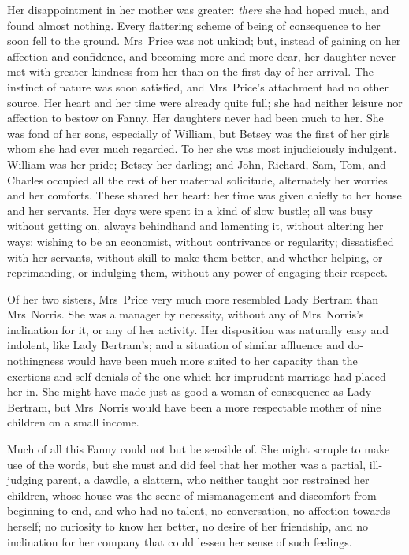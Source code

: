 Her disappointment in her mother was greater: \textit{there}  she had hoped much, and found almost nothing. Every flattering scheme of being of consequence to her soon fell to the ground. Mrs~Price was not unkind; but, instead of gaining on her affection and confidence, and becoming more and more dear, her daughter never met with greater kindness from her than on the first day of her arrival. The instinct of nature was soon satisfied, and Mrs~Price's attachment had no other source. Her heart and her time were already quite full; she had neither leisure nor affection to bestow on Fanny. Her daughters never had been much to her. She was fond of her sons, especially of William, but Betsey was the first of her girls whom she had ever much regarded. To her she was most injudiciously indulgent. William was her pride; Betsey her darling; and John, Richard, Sam, Tom, and Charles occupied all the rest of her maternal solicitude, alternately her worries and her comforts. These shared her heart: her time was given chiefly to her house and her servants. Her days were spent in a kind of slow bustle; all was busy without getting on, always behindhand and lamenting it, without altering her ways; wishing to be an economist, without contrivance or regularity; dissatisfied with her servants, without skill to make them better, and whether helping, or reprimanding, or indulging them, without any power of engaging their respect.

Of her two sisters, Mrs~Price very much more resembled Lady Bertram than Mrs~Norris. She was a manager by necessity, without any of Mrs~Norris's inclination for it, or any of her activity. Her disposition was naturally easy and indolent, like Lady Bertram's; and a situation of similar affluence and do-nothingness would have been much more suited to her capacity than the exertions and self-denials of the one which her imprudent marriage had placed her in. She might have made just as good a woman of consequence as Lady Bertram, but Mrs~Norris would have been a more respectable mother of nine children on a small income.

Much of all this Fanny could not but be sensible of. She might scruple to make use of the words, but she must and did feel that her mother was a partial, ill-judging parent, a dawdle, a slattern, who neither taught nor restrained her children, whose house was the scene of mismanagement and discomfort from beginning to end, and who had no talent, no conversation, no affection towards herself; no curiosity to know her better, no desire of her friendship, and no inclination for her company that could lessen her sense of such feelings.

